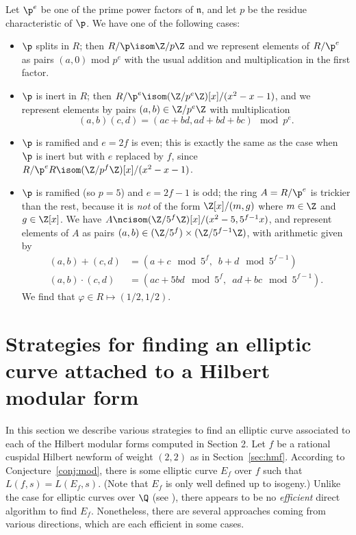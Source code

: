 \documentclass{amsart}
\newcommand{\n}{\mathfrak{n}}
\begin{document}
Let $\p^e$ be one of the prime power factors of $\n$, and let $p$ be the residue
characteristic of $\p$. We have one of the following cases:
\begin{itemize}
\item $\p$ splits in $R$; then $R/\p\isom \Z/p\Z$ and we represent elements
of $R/\p^e$ as pairs $(a,0)$ mod $p^e$ with the usual addition and multiplication
in the first factor.
\item $\p$ is inert in $R$; then $R/\p^e\isom (\Z/p^e\Z)[x]/(x^2-x-1)$,
and we represent elements by pairs $(a,b) \in \Z/p^e\Z$ with multiplication
$$(a,b)(c,d) = (ac+bd,ad+bd+bc) \mod p^e.$$
\item $\p$ is ramified and $e=2f$ is even; this is exactly the
same as the case when $\p$ is inert but with $e$ replaced by $f$,
since $R/\p^eR \isom (\Z/p^{f}\Z)[x]/(x^2-x-1)$.
\item $\p$ is ramified (so $p=5$) and $e=2f-1$ is odd; the ring $A=R/\p^e$
  is trickier than the rest, because it is {\em not} of the form
  $\Z[x]/(m,g)$ where $m\in\Z$ and $g \in\Z[x]$.  We have $A \ncisom
  (\Z/5^f\Z)[x]/(x^2-5, 5^{f-1}x)$, and represent elements of $A$ as
  pairs $(a,b) \in (\Z/5^f)\times (\Z/5^{f-1}\Z)$, with arithmetic
  given by
\begin{align*}
(a,b) + (c,d) &= (a+c \mod 5^f,\,\,\, b+d \mod 5^{f-1})\\
(a,b)\cdot (c,d) &= (ac+5bd \mod 5^f,\,\,\, ad+bc \mod 5^{f-1}).
\end{align*}
 We find that $ \varphi \in R \mapsto (1/2,1/2)$.
\end{itemize}



\section{Strategies for finding an elliptic curve attached to a Hilbert modular form}\label{sec:finding}
In this section we describe various strategies to find an elliptic curve
 associated to each of the Hilbert modular forms computed in Section 2.
Let $f$ be a rational cuspidal Hilbert newform of weight $(2,2)$ as
in Section~\ref{sec:hmf}.  According to Conjecture~\ref{conj:mod},
there is some elliptic curve $E_f$ over $f$ such that $L(f,s) =
L(E_f,s)$.  (Note that $E_f$ is only well defined up to isogeny.)
Unlike the case for elliptic curves over $\Q$ (see \cite{cremona:algs}), 
there appears to be no {\em efficient} direct algorithm to find $E_f$.
 Nonetheless, there are several approaches coming from various directions, 
which are each efficient in some cases.
\end{document}
